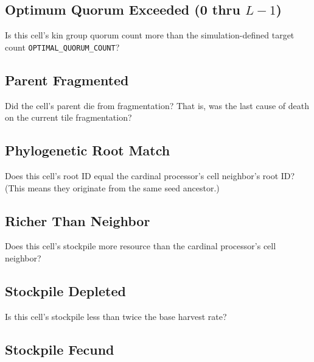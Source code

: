 \subsection{Optimum Quorum Exceeded (0 thru $L-1$)}


Is this cell's kin group quorum count more than the simulation-defined target count \texttt{OPTIMAL\_QUORUM\_COUNT}?

\subsection{Parent Fragmented}


Did the cell's parent die from fragmentation?
That is, was the last cause of death on the current tile fragmentation?

\subsection{Phylogenetic Root Match}


Does this cell's root ID equal the cardinal processor's cell neighbor's root ID?
(This means they originate from the same seed ancestor.)

\subsection{Richer Than Neighbor}


Does this cell's stockpile more resource than the cardinal processor's cell neighbor?

\subsection{Stockpile Depleted}


Is this cell's stockpile less than twice the base harvest rate?

\subsection{Stockpile Fecund}

